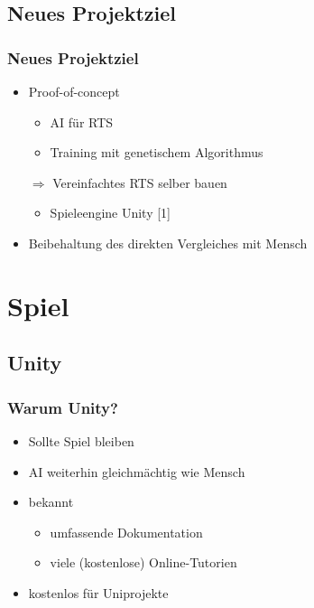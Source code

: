 \documentclass[compress]{beamer}
\begin{document}
\subsection{Neues Projektziel}

\begin{frame}
	\frametitle{Neues Projektziel}

	\begin{itemize}
		\item Proof-of-concept
		\begin{itemize}
			\item AI für RTS
			\item Training mit genetischem Algorithmus
		\end{itemize}
		\item[$\Rightarrow$] Vereinfachtes RTS selber bauen
		\begin{itemize}
			\item Spieleengine Unity [1]
		\end{itemize}
		\item Beibehaltung des direkten Vergleiches mit Mensch
	\end{itemize}
\end{frame}



\section{Spiel}
\subsection{Unity}

\begin{frame}
	\frametitle{Warum Unity?}

	\begin{itemize}
		\item Sollte Spiel bleiben
		\item AI weiterhin gleichmächtig wie Mensch
		\item bekannt
		\begin{itemize}
			\item umfassende Dokumentation
			\item viele (kostenlose) Online-Tutorien
		\end{itemize}
		\item kostenlos für Uniprojekte
		
	\end{itemize}
\end{frame}
\end{document}
